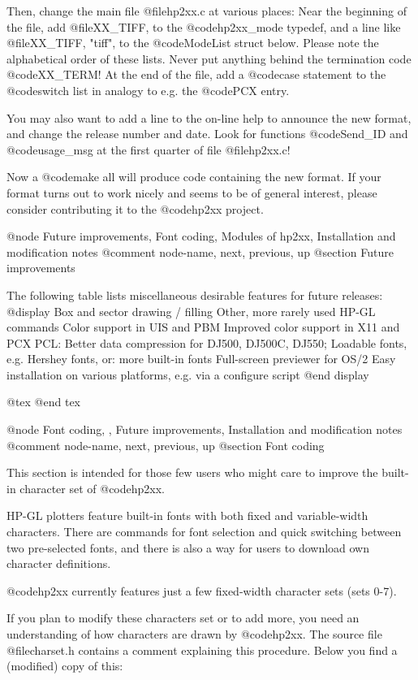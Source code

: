 Then, change the main file @file{hp2xx.c} at various places: Near the
beginning of the file, add @file{XX_TIFF, } to the @code{hp2xx_mode} typedef,
and a line like @file{XX_TIFF,   "tiff", } to the @code{ModeList} struct below.
Please note the alphabetical order of these lists. Never put anything behind
the termination code @code{XX_TERM}! At the end of the file,
add a @code{case} statement to the @code{switch} list in analogy to e.g.
the @code{PCX} entry.

You may also want to add a line to the on-line help to
announce the new format, and change the release number and date.
Look for functions @code{Send_ID} and @code{usage_msg} at the first quarter
of file @file{hp2xx.c}!

Now a @code{make all} will produce code containing the new format.
If your format turns out to work nicely and seems to be of general interest,
please consider contributing it to the @code{hp2xx} project.



@node Future improvements, Font coding, Modules of hp2xx, Installation and modification notes
@comment  node-name,  next,  previous,  up
@section Future improvements

The following table lists miscellaneous desirable features for future
releases:
@display
  Box and sector drawing / filling
  Other, more rarely used HP-GL commands
  Color support in UIS and PBM
  Improved color support in X11 and PCX
  PCL: Better data compression for DJ500, DJ500C, DJ550;
  Loadable fonts, e.g. Hershey fonts, or: more built-in fonts
  Full-screen previewer for OS/2
  Easy installation on various platforms, e.g. via a configure script
@end display

@tex
\page
@end tex

@node Font coding, , Future improvements, Installation and modification notes
@comment  node-name,  next,  previous,  up
@section Font coding

This section is intended for those few users who might care to
improve the built-in character set of @code{hp2xx}.

HP-GL plotters feature built-in fonts with both fixed and
variable-width characters. There are commands for font selection
and quick switching between two pre-selected fonts, and there
is also a way for users to download own character definitions.

@code{hp2xx} currently features just a few fixed-width  character sets 
(sets 0-7).

If you plan to modify these characters set or to add more,
you need an understanding of how characters are drawn by
@code{hp2xx}. The source file @file{charset.h} contains a comment
explaining this procedure. Below you find a (modified) copy of
this:

